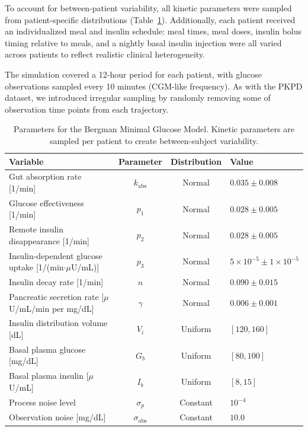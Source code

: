 \documentclass[preprint,12pt]{elsarticle}
\begin{document}
To account for between-patient variability, all kinetic parameters were sampled from patient-specific distributions (Table~\ref{tab:glucose_parameters}). Additionally, each patient received an individualized meal and insulin schedule: meal times, meal doses, insulin bolus timing relative to meals, and a nightly basal insulin injection were all varied across patients to reflect realistic clinical heterogeneity.

The simulation covered a 12-hour period for each patient, with glucose observations sampled every 10 minutes (CGM-like frequency). As with the PKPD dataset, we introduced irregular sampling by randomly removing some of observation time points from each trajectory.

\begin{table}[h!]
\centering
\caption{Parameters for the Bergman Minimal Glucose Model. Kinetic parameters are sampled per patient to create between-subject variability.}
\label{tab:glucose_parameters}
\begin{small}
\begin{tabularx}{\textwidth}{>{\raggedright\arraybackslash}p{4.5cm} c c >{\raggedright\arraybackslash}X}
\toprule
\textbf{Variable} & \textbf{Parameter} & \textbf{Distribution} & \textbf{Value} \\
\midrule
Gut absorption rate [1/min] & $k_{\text{abs}}$ & Normal & $0.035 \pm 0.008$ \\
Glucose effectiveness [1/min] & $p_1$ & Normal & $0.028 \pm 0.005$ \\
Remote insulin disappearance [1/min] & $p_2$ & Normal & $0.028 \pm 0.005$ \\
Insulin-dependent glucose uptake [1/(min$\cdot \mu$U/mL)] & $p_3$ & Normal & $5 \times 10^{-5} \pm 1 \times 10^{-5}$ \\
Insulin decay rate [1/min] & $n$ & Normal & $0.090 \pm 0.015$ \\
Pancreatic secretion rate [$\mu$U/mL/min per mg/dL] & $\gamma$ & Normal & $0.006 \pm 0.001$ \\
Insulin distribution volume [dL] & $V_i$ & Uniform & $[120, 160]$ \\
Basal plasma glucose [mg/dL] & $G_b$ & Uniform & $[80, 100]$ \\
Basal plasma insulin [$\mu$U/mL] & $I_b$ & Uniform & $[8, 15]$ \\
Process noise level & $\sigma_p$ & Constant & $10^{-4}$ \\
Observation noise [mg/dL] & $\sigma_{\text{obs}}$ & Constant & $10.0$ \\
\bottomrule
\end{tabularx}
\end{small}
\end{table}
\end{document}
